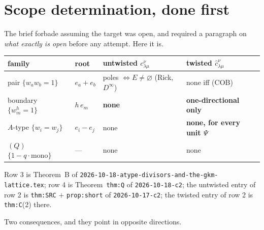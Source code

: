 \documentclass[11pt]{article}
\theoremstyle{definition}
\newcommand{\At}{\widetilde{A}}
\newcommand{\bA}{\mathbf{A}}
\newcommand{\bB}{\mathbf{B}}
\newcommand{\sm}{\smallsetminus}
\begin{document}
\begin{abstract}
Two by-products.  \textbf{(i)} Motegi's order is the \emph{tail-counting} order
$\bB\le\bA\iff\#\{c\in\bB:c\ge k\}\le\#\{c\in\bA:c\ge k\}\ \forall k$
(Lemma~\ref{lem:order}); transitivity, $\bA\sm\{m\}\le\bA$, and
\textbf{complementation as an order anti-automorphism} all drop out, and the last
is what makes Motegi's inverse formula's support match the down-set.
\textbf{(ii)} $\Delta^{X}_{\bA}$ of \texttt{eq:allcard-Delta-factor}
(\texttt{2610.15344} L4257--4262) \emph{is} my diagonal entry $\At_{\bA,\bA}$, so
his all-cardinality biorthogonality gives $\Phi^{-1}$ in my own notation; I
verified it first-hand against my symmetrisation engine, $336/336$.
\end{abstract}

\tableofcontents

\section{Scope determination, done first}
\label{sec:scope}

The brief forbade assuming the target was open, and required a paragraph on
\emph{what exactly is open} before any attempt.  Here it is.

\begin{center}
\begin{tabular}{llll}
\toprule
family & root & untwisted $c^{\nu}_{\lambda\mu}$ & twisted $\hat c^{\nu}_{\lambda\mu}$\\
\midrule
pair $\{w_aw_b=1\}$ & $e_a+e_b$ & poles $\iff E\ne\varnothing$ (Rick, $D^\infty$)
   & none iff \textup{(COB)} \\
boundary $\{w_m^{h}=1\}$ & $h\,e_m$ & \textbf{none} & \textbf{one-directional only}\\
$A$-type $\{w_i=w_j\}$ & $e_i-e_j$ & none & \textbf{none, for every unit $\Psi$}\\
$(Q)$ $\{1-q\cdot\text{mono}\}$ & --- & none & none\\
\bottomrule
\end{tabular}
\end{center}

\noindent
Row 3 is Theorem~B of \texttt{2026-10-18-atype-divisors-and-the-gkm-lattice.tex};
row 4 is Theorem~\texttt{thm:Q} of \texttt{2026-10-18-c2}; the untwisted entry of
row 2 is \texttt{thm:SRC} $+$ \texttt{prop:short} of \texttt{2026-10-17-c2}; the
twisted entry of row 2 is \texttt{thm:C}(2) there.

Two consequences, and they point in opposite directions.
\end{document}
